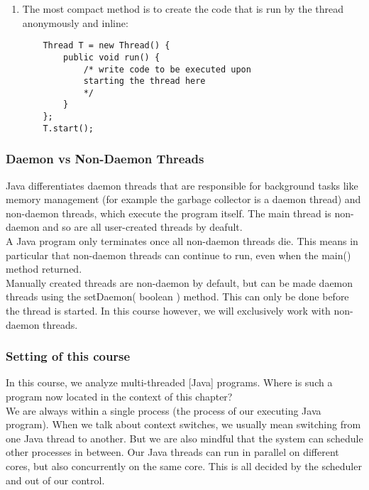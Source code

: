 \documentclass[main]{subfiles}
\begin{document}
\begin{enumerate}
    \item The most compact method is to create the code that is run by the thread anonymously and inline:
    \begin{verbatim}
    Thread T = new Thread() {
        public void run() {
            /* write code to be executed upon
            starting the thread here
            */
        }
    };
    T.start();
    \end{verbatim}
\end{enumerate}

\subsubsection{Daemon vs Non-Daemon Threads}
Java differentiates daemon threads that are responsible for background tasks like memory management (for example the garbage collector is a daemon thread) and non-daemon threads, which execute the program itself. The main thread is non-daemon and so are all user-created threads by deafult.\\
A Java program only terminates once all non-daemon threads die. This means in particular that non-daemon threads can continue to run, even when the main() method returned.\\
Manually created threads are non-daemon by default, but can be made daemon threads using the setDaemon( boolean ) method. This can only be done before the thread is started. In this course however, we will exclusively work with non-daemon threads.

\subsubsection{Setting of this course}
In this course, we analyze multi-threaded [Java] programs. Where is such a program now located in the context of this chapter?\\
We are always within a single process (the process of our executing Java program). When we talk about context switches, we usually mean switching from one Java thread to another. But we are also mindful that the system can schedule other processes in between. Our Java threads can run in parallel on different cores, but also concurrently on the same core. This is all decided by the scheduler and out of our control.
\end{document}
